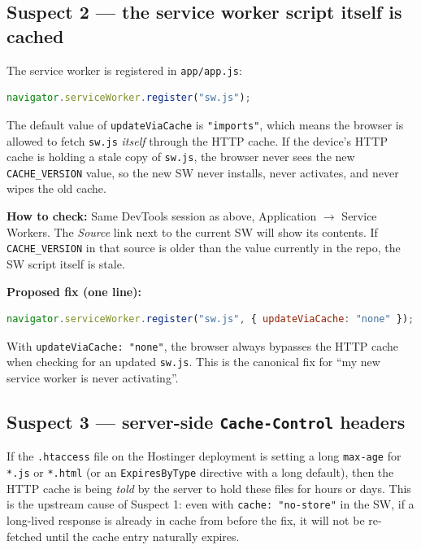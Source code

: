 \documentclass[11pt,a4paper]{article}
\begin{document}
\subsection{Suspect 2 --- the service worker script itself is cached}

The service worker is registered in \texttt{app/app.js}:

\begin{lstlisting}[language=js]
navigator.serviceWorker.register("sw.js");
\end{lstlisting}

The default value of \texttt{updateViaCache} is \texttt{"imports"}, which means the browser is allowed to fetch \texttt{sw.js} \emph{itself} through the HTTP cache. If the device's HTTP cache is holding a stale copy of \texttt{sw.js}, the browser never sees the new \texttt{CACHE\_VERSION} value, so the new SW never installs, never activates, and never wipes the old cache.

\textbf{How to check:} Same DevTools session as above, Application $\to$ Service Workers. The \emph{Source} link next to the current SW will show its contents. If \texttt{CACHE\_VERSION} in that source is older than the value currently in the repo, the SW script itself is stale.

\textbf{Proposed fix (one line):}

\begin{lstlisting}[language=js]
navigator.serviceWorker.register("sw.js", { updateViaCache: "none" });
\end{lstlisting}

With \texttt{updateViaCache: "none"}, the browser always bypasses the HTTP cache when checking for an updated \texttt{sw.js}. This is the canonical fix for ``my new service worker is never activating''.

\subsection{Suspect 3 --- server-side \texttt{Cache-Control} headers}

If the \texttt{.htaccess} file on the Hostinger deployment is setting a long \texttt{max-age} for \texttt{*.js} or \texttt{*.html} (or an \texttt{ExpiresByType} directive with a long default), then the HTTP cache is being \emph{told} by the server to hold these files for hours or days. This is the upstream cause of Suspect 1: even with \texttt{cache: "no-store"} in the SW, if a long-lived response is already in cache from before the fix, it will not be re-fetched until the cache entry naturally expires.
\end{document}
